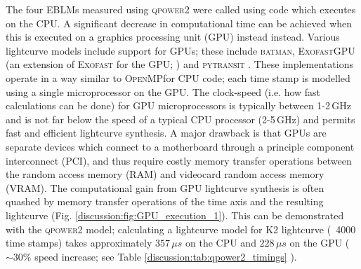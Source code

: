 The four EBLMs measured using \textsc{qpower2} were called using code which executes on the CPU. A significant decrease in computational time can be achieved when this is executed on a graphics processing unit (GPU) instead instead. Various lightcurve models include support for GPUs; these include \textsc{batman}, \textsc{ExofastGPU} (an extension of \textsc{Exofast} for the GPU; \citealt{017ascl.soft10003E}) and \textsc{pytransit} \citep{2015MNRAS.450.3233P}. These implementations operate in a way similar to \textsc{OpenMP}\textregistered for CPU code; each time stamp is modelled using a single microprocessor on the GPU. The clock-speed (i.e. how fast calculations can be done) for GPU microprocessors is typically between 1-2\,GHz and is not far below the speed of a typical CPU processor (2-5\,GHz) and permits fast and efficient lightcurve synthesis. A major drawback is that GPUs are separate devices which connect to a motherboard through a principle component interconnect (PCI), and thus require costly memory transfer operations between the random access memory (RAM) and videocard random access memory (VRAM). The computational gain from GPU lightcurve synthesis is often quashed by memory transfer operations of the time axis and the resulting lightcurve (Fig. \ref{discussion:fig:GPU_execution_1}). This can be demonstrated with the \textsc{qpower2} model; calculating a lightcurve model for K2 lightcurve (~4000 time stamps) takes approximately $357\,\mu s$ on the CPU and $228\,\mu s$ on the GPU ($\sim 30\%$ speed increase; see Table \ref{discussion:tab:qpower2_timings} ). 

